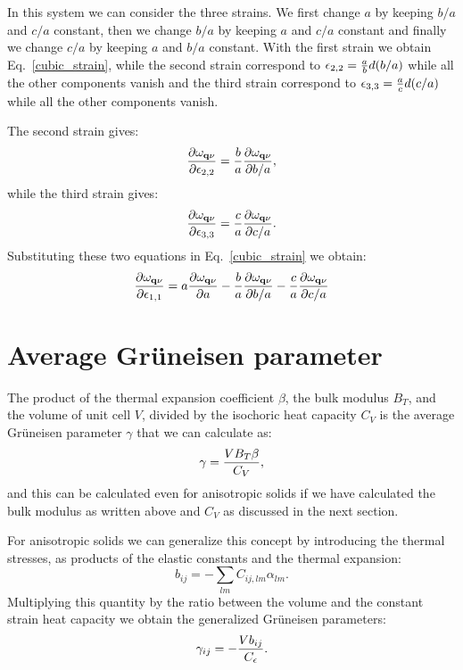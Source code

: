 \documentclass[12pt,a4paper,twoside]{report}
\begin{document}
In this system we can consider the three strains. We first change $a$
by keeping $b/a$ and $c/a$ constant, then we change $b/a$ by keeping $a$
and $c/a$ constant and finally we change $c/a$ by keeping $a$ and $b/a$ 
constant. With the first strain we obtain Eq.~\ref{cubic_strain}, while
the second strain correspond to
$\epsilon_{2,2}= {a \over b} d (b/a) $ while all the other
components vanish and the third strain correspond to 
$\epsilon_{3,3}= {a \over c} d (c/a) $ while all the other
components vanish.

The second strain gives:
\begin{equation}
{\partial \omega_{{\bf q}\nu} \over \partial \epsilon_{2,2}} = 
{b\over a} {\partial \omega_{{\bf q}\nu} \over \partial b/a},
\end{equation}
while the third strain gives:
\begin{equation}
{\partial \omega_{{\bf q}\nu} 
\over \partial \epsilon_{3,3}} = {c\over a} {\partial \omega_{{\bf q}\nu} 
\over \partial c/a}.
\end{equation}
Substituting these two equations in Eq.~\ref{cubic_strain} we obtain:
\begin{equation}
{\partial \omega_{{\bf q}\nu} \over \partial \epsilon_{1,1}} 
 = a {\partial \omega_{{\bf q}\nu} \over \partial a} - 
{b\over a} {\partial \omega_{{\bf q}\nu} 
\over \partial b/a} - {c\over a} {\partial \omega_{{\bf q}\nu} 
\over \partial c/a}
\end{equation}
%
\newpage
{\color{dark-blue}\chapter{Average Gr\"uneisen parameter}}
\color{black}

The product of the thermal expansion coefficient $\beta$, the bulk modulus
$B_T$, and the volume of unit cell $V$, divided by the isochoric
heat capacity $C_V$ is the average Gr\"uneisen parameter $\gamma$
that we can calculate as:
\begin{equation}
\gamma = {V B_T \beta \over C_V},
\end{equation}
and this can be calculated even for anisotropic solids if we have
calculated the bulk modulus as written above and $C_V$ as discussed in
the next section.

For anisotropic solids we can generalize this concept by introducing
the thermal stresses, as products of the elastic constants and the
thermal expansion:
\begin{equation}
b_{ij} = -\sum_{lm} C_{ij,lm} \alpha_{lm}.
\end{equation}
Multiplying this quantity by the ratio between the volume and the
constant strain heat capacity we obtain the generalized Gr\"uneisen
parameters:
\begin{equation}
\gamma_{ij} = - {V b_{ij} \over C_\epsilon}.
\end{equation}
\end{document}
